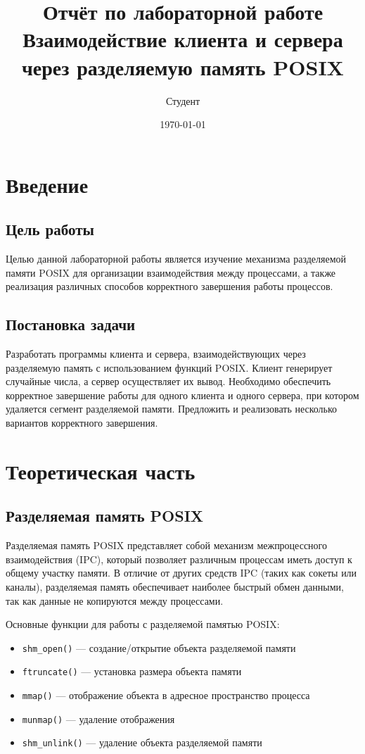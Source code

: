 \documentclass[a4paper,12pt]{article}
\title{Отчёт по лабораторной работе\\
\large{Взаимодействие клиента и сервера через разделяемую память POSIX}}
\author{Студент}
\date{\today}
\begin{document}
\maketitle
\tableofcontents
\newpage

\section{Введение}

\subsection{Цель работы}
Целью данной лабораторной работы является изучение механизма разделяемой памяти POSIX для организации взаимодействия между процессами, а также реализация различных способов корректного завершения работы процессов.

\subsection{Постановка задачи}
Разработать программы клиента и сервера, взаимодействующих через разделяемую память с использованием функций POSIX. Клиент генерирует случайные числа, а сервер осуществляет их вывод. Необходимо обеспечить корректное завершение работы для одного клиента и одного сервера, при котором удаляется сегмент разделяемой памяти. Предложить и реализовать несколько вариантов корректного завершения.

\section{Теоретическая часть}

\subsection{Разделяемая память POSIX}
Разделяемая память POSIX представляет собой механизм межпроцессного взаимодействия (IPC), который позволяет различным процессам иметь доступ к общему участку памяти. В отличие от других средств IPC (таких как сокеты или каналы), разделяемая память обеспечивает наиболее быстрый обмен данными, так как данные не копируются между процессами.

Основные функции для работы с разделяемой памятью POSIX:
\begin{itemize}
    \item \texttt{shm\_open()} — создание/открытие объекта разделяемой памяти
    \item \texttt{ftruncate()} — установка размера объекта памяти
    \item \texttt{mmap()} — отображение объекта в адресное пространство процесса
    \item \texttt{munmap()} — удаление отображения
    \item \texttt{shm\_unlink()} — удаление объекта разделяемой памяти
\end{itemize}
\end{document}
